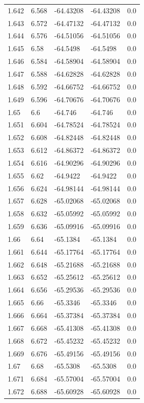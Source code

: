 \begin{tabular}{lllll}
1.642 & 6.568 & -64.43208 & -64.43208 & 0.0 \\
1.643 & 6.572 & -64.47132 & -64.47132 & 0.0 \\
1.644 & 6.576 & -64.51056 & -64.51056 & 0.0 \\
1.645 & 6.58 & -64.5498 & -64.5498 & 0.0 \\
1.646 & 6.584 & -64.58904 & -64.58904 & 0.0 \\
1.647 & 6.588 & -64.62828 & -64.62828 & 0.0 \\
1.648 & 6.592 & -64.66752 & -64.66752 & 0.0 \\
1.649 & 6.596 & -64.70676 & -64.70676 & 0.0 \\
1.65 & 6.6 & -64.746 & -64.746 & 0.0 \\
1.651 & 6.604 & -64.78524 & -64.78524 & 0.0 \\
1.652 & 6.608 & -64.82448 & -64.82448 & 0.0 \\
1.653 & 6.612 & -64.86372 & -64.86372 & 0.0 \\
1.654 & 6.616 & -64.90296 & -64.90296 & 0.0 \\
1.655 & 6.62 & -64.9422 & -64.9422 & 0.0 \\
1.656 & 6.624 & -64.98144 & -64.98144 & 0.0 \\
1.657 & 6.628 & -65.02068 & -65.02068 & 0.0 \\
1.658 & 6.632 & -65.05992 & -65.05992 & 0.0 \\
1.659 & 6.636 & -65.09916 & -65.09916 & 0.0 \\
1.66 & 6.64 & -65.1384 & -65.1384 & 0.0 \\
1.661 & 6.644 & -65.17764 & -65.17764 & 0.0 \\
1.662 & 6.648 & -65.21688 & -65.21688 & 0.0 \\
1.663 & 6.652 & -65.25612 & -65.25612 & 0.0 \\
1.664 & 6.656 & -65.29536 & -65.29536 & 0.0 \\
1.665 & 6.66 & -65.3346 & -65.3346 & 0.0 \\
1.666 & 6.664 & -65.37384 & -65.37384 & 0.0 \\
1.667 & 6.668 & -65.41308 & -65.41308 & 0.0 \\
1.668 & 6.672 & -65.45232 & -65.45232 & 0.0 \\
1.669 & 6.676 & -65.49156 & -65.49156 & 0.0 \\
1.67 & 6.68 & -65.5308 & -65.5308 & 0.0 \\
1.671 & 6.684 & -65.57004 & -65.57004 & 0.0 \\
1.672 & 6.688 & -65.60928 & -65.60928 & 0.0 \\

\end{tabular}

